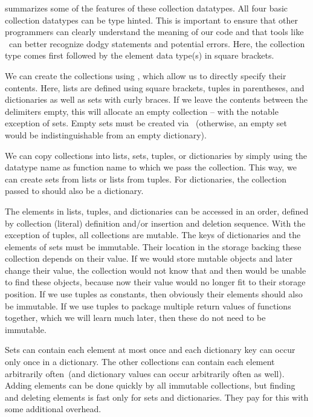  summarizes some of the features of these collection datatypes.
All four basic collection datatypes can be type hinted.
This is important to ensure that other programmers can clearly understand the meaning of our code and that tools like \mypy\ can better recognize dodgy statements and potential errors.
Here, the collection type comes first followed by the element data type(s) in square brackets.

We can create the collections using , which allow us to directly specify their contents.
Here, lists are defined using square brackets, tuples in parentheses, and dictionaries as well as sets with curly braces.
If we leave the contents between the delimiters empty, this will allocate an empty collection -- with the notable exception of sets.
Empty sets must be created via ~(otherwise, an empty set would be indistinguishable from an empty dictionary).

We can copy collections into lists, sets, tuples, or dictionaries by simply using the datatype name as function name to which we pass the collection.
This way, we can create sets from lists or lists from tuples.
For dictionaries, the collection passed to  should also be a dictionary.

The elements in lists, tuples, and dictionaries can be accessed in an order, defined by collection (literal) definition and/or insertion and deletion sequence.
With the exception of tuples, all collections are mutable.
The keys of dictionaries and the elements of sets must be immutable.
Their location in the storage backing these collection depends on their value.
If we would store mutable objects and later change their value, the collection would not know that and then would be unable to find these objects, because now their value would no longer fit to their storage position.
If we use tuples as constants, then obviously their elements should also be immutable.
If we use tuples to package multiple return values of functions together, which we will learn much later, then these do not need to be immutable.

Sets can contain each element at most once and each dictionary key can occur only once in a dictionary.
The other collections can contain each element arbitrarily often~(and dictionary values can occur arbitrarily often as well).
Adding elements can be done quickly by all immutable collections, but finding and deleting elements is fast only for sets and dictionaries.
They pay for this with some additional overhead.

